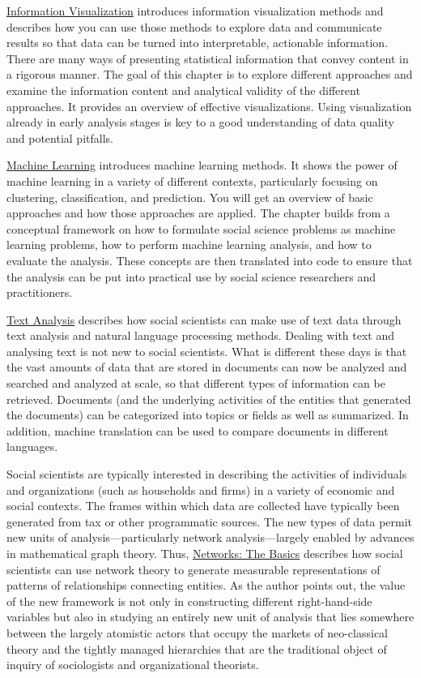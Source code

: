 \documentclass[]{krantz}
\begin{document}
\protect\hyperlink{chap:viz}{Information Visualization} introduces
information visualization methods and describes how you can use those
methods to explore data and communicate results so that data can be
turned into interpretable, actionable information. There are many ways
of presenting statistical information that convey content in a rigorous
manner. The goal of this chapter is to explore different approaches and
examine the information content and analytical validity of the different
approaches. It provides an overview of effective visualizations. Using
visualization already in early analysis stages is key to a good
understanding of data quality and potential pitfalls.

\protect\hyperlink{chap:ml}{Machine Learning} introduces machine
learning methods. It shows the power of machine learning in a variety of
different contexts, particularly focusing on clustering, classification,
and prediction. You will get an overview of basic approaches and how
those approaches are applied. The chapter builds from a conceptual
framework on how to formulate social science problems as machine
learning problems, how to perform machine learning analysis, and how to
evaluate the analysis. These concepts are then translated into code to
ensure that the analysis can be put into practical use by social science
researchers and practitioners.

\protect\hyperlink{chap:text}{Text Analysis} describes how social
scientists can make use of text data through text analysis and natural
language processing methods. Dealing with text and analysing text is not
new to social scientists. What is different these days is that the vast
amounts of data that are stored in documents can now be analyzed and
searched and analyzed at scale, so that different types of information
can be retrieved. Documents (and the underlying activities of the
entities that generated the documents) can be categorized into topics or
fields as well as summarized. In addition, machine translation can be
used to compare documents in different languages.

Social scientists are typically interested in describing the activities
of individuals and organizations (such as households and firms) in a
variety of economic and social contexts. The frames within which data
are collected have typically been generated from tax or other
programmatic sources. The new types of data permit new units of
analysis---particularly network analysis---largely enabled by advances
in mathematical graph theory. Thus,
\protect\hyperlink{chap:networks}{Networks: The Basics} describes how
social scientists can use network theory to generate measurable
representations of patterns of relationships connecting entities. As the
author points out, the value of the new framework is not only in
constructing different right-hand-side variables but also in studying an
entirely new unit of analysis that lies somewhere between the largely
atomistic actors that occupy the markets of neo-classical theory and the
tightly managed hierarchies that are the traditional object of inquiry
of sociologists and organizational theorists.
\end{document}
